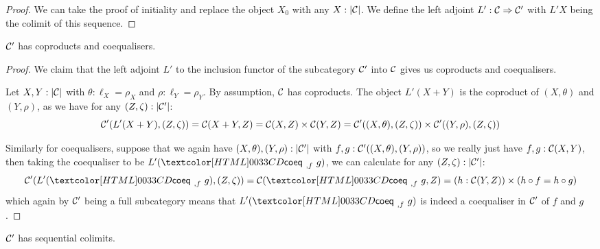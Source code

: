 \begin{proof}
  We can take the proof of initiality and replace the object $X_0$
  with any $X : | \mathcal{C} |$. We define the left adjoint
  $L' : \mathcal{C} \Rightarrow \mathcal{C}'$ with $L' X$ being the colimit of this
  sequence.
\end{proof}

\begin{proposition}
  $\mathcal{C}'$ has coproducts and coequalisers.
\end{proposition}

\begin{proof}
  We claim that the left adjoint $L'$ to the inclusion functor of the
  subcategory $\mathcal{C}'$ into $\mathcal{C}$ gives us coproducts and coequalisers. 

  Let $X, Y : | \mathcal{C} |$ with $\theta : \ell_X = \rho_X$ and
  $\rho : \ell_Y = \rho_Y$. By assumption, $\mathcal{C}$ has coproducts. The
  object $L' (X + Y)$ is the coproduct of $(X,\theta)$ and $(Y,\rho)$,
  as we have for any $(Z,\zeta) : | \mathcal{C}' |$:
  $$
  \mathcal{C}'(L'(X+Y),(Z,\zeta)) = \mathcal{C}(X+Y,Z) = \mathcal{C}(X,Z) \times \mathcal{C}(Y,Z) = \mathcal{C}'((X,\theta),(Z,\zeta)) \times \mathcal{C}'((Y,\rho),(Z,\zeta))
  $$

  Similarly for coequalisers, suppose that we again have
  $(X,\theta), (Y,\rho) : | \mathcal{C}' |$ with
  $f, g : \mathcal{C}'((X,\theta),(Y,\rho))$, so we really just have
  $f, g : \mathcal{C}(X,Y)$, then taking the coequaliser to be
  $L' (\coeqty\ f\ g)$, we can calculate for any $(Z,\zeta) : | \mathcal{C}' |$:
  $$
  \Cc'(L'(\coeqty\ f\ g),(Z,\zeta)) = \Cc(\coeqty\ f\ g, Z) = (h : \Cc(Y,Z)) \times (h \circ f = h \circ g)
  $$
  which again by $\mathcal{C}'$ being a full subcategory means that
  $L'(\coeqty\ f\ g)$ is indeed a coequaliser in $\mathcal{C}'$ of $f$ and $g$.
\end{proof}

\begin{proposition}
  $\mathcal{C}'$ has sequential colimits.
\end{proposition}

